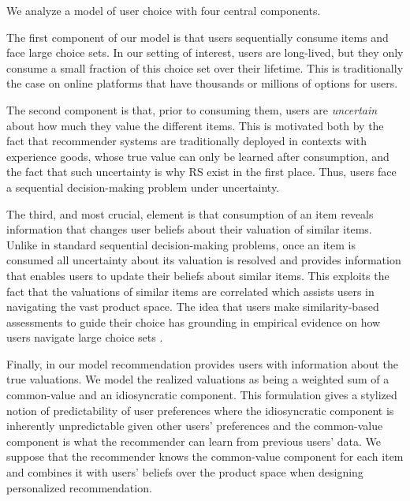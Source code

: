 \documentclass[manuscript, nonacm]{acmart}
\newcommand{\xhdr}[1]{\vspace{1mm} \noindent{\bf #1}}
\begin{document}
\xhdr{Our Model.} We analyze a model of user choice with four central components.
\par
The first component of our model is that users sequentially consume items and face large choice sets. In our setting of interest, users are long-lived, but they only consume a small fraction of this choice set over their lifetime. This is traditionally the case on online platforms that have thousands or millions of options for users.
\par
The second component is that, prior to consuming them, users are \textit{uncertain} about how much they value the different items.
This is motivated both by the fact that recommender systems are traditionally deployed in contexts with experience goods, whose true value can only be learned after consumption, and the fact that such uncertainty is why RS exist in the first place. Thus, users face a sequential decision-making problem under uncertainty.
\par 
The third, and most crucial, element is that consumption of an item reveals information that changes user beliefs about their valuation of similar items. Unlike in standard sequential decision-making problems, once an item is consumed all uncertainty about its valuation is resolved and provides information that enables users to update their beliefs about similar items. This exploits the fact that the valuations of similar items are correlated which assists users in navigating the vast product space. The idea that users make similarity-based assessments to guide their choice has grounding in empirical evidence on how users navigate large choice sets \cite{schulz2019structured}.
\par 
Finally, in our model recommendation provides users with information about the true valuations. We model the realized valuations as being a weighted sum of a common-value and an idiosyncratic component. This formulation gives a stylized notion of predictability of user preferences where the idiosyncratic component is inherently unpredictable given other users' preferences and the common-value component is what the recommender can learn from previous users' data. We suppose that the recommender knows the common-value component for each item and combines it with users' beliefs over the product space when designing personalized recommendation.
\end{document}
